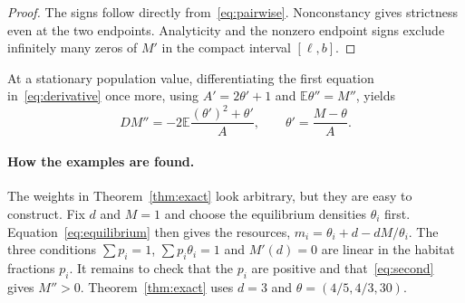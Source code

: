 \documentclass[11pt]{article}
\theoremstyle{remark}
\newcommand{\E}{\mathbb E}
\begin{document}
\begin{proof}
The signs follow directly from~\eqref{eq:pairwise}. Nonconstancy gives
strictness even at the two endpoints. Analyticity and the nonzero
endpoint signs exclude infinitely many zeros of \(M'\) in the compact
interval \([\ell,b]\).
\end{proof}

At a stationary population value, differentiating the first equation
in~\eqref{eq:derivative} once more, using \(A'=2\theta'+1\) and
\(\E\theta''=M''\), yields
\begin{equation}\label{eq:second}
 D M''=-2\E\frac{(\theta')^2+\theta'}{A},
 \qquad \theta'=\frac{M-\theta}{A}.
\end{equation}

\paragraph{How the examples are found.}
The weights in Theorem~\ref{thm:exact} look arbitrary, but they are
easy to construct. Fix \(d\) and \(M=1\) and choose the equilibrium
densities \(\theta_i\) first. Equation~\eqref{eq:equilibrium} then gives
the resources, \(m_i=\theta_i+d-dM/\theta_i\). The three conditions
\(\sum p_i=1\), \(\sum p_i\theta_i=1\) and \(M'(d)=0\) are linear in the
habitat fractions \(p_i\). It remains to check that the \(p_i\) are
positive and that~\eqref{eq:second} gives \(M''>0\). Theorem~\ref{thm:exact}
uses \(d=3\) and \(\theta=(4/5,4/3,30)\).
\end{document}
